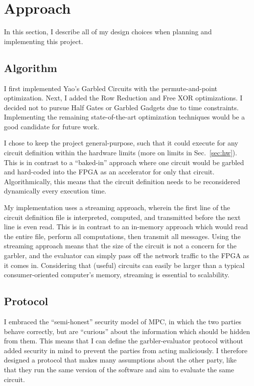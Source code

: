 \section{Approach}
In this section, I describe all of my design choices when planning and implementing this project.

\subsection{Algorithm}
I first implemented Yao's Garbled Circuits with the permute-and-point optimization. Next, I added the Row Reduction and Free XOR optimizations. I decided not to pursue Half Gates or Garbled Gadgets due to time constraints. Implementing the remaining state-of-the-art optimization techniques would be a good candidate for future work.

I chose to keep the project general-purpose, such that it could execute for any circuit definition within the hardware limits (more on limits in Sec.~\ref{sec:hw}). This is in contrast to a ``baked-in'' approach where one circuit would be garbled and hard-coded into the FPGA as an accelerator for only that circuit. Algorithmically, this means that the circuit definition needs to be reconsidered dynamically every execution time.

My implementation uses a streaming approach, wherein the first line of the circuit definition file is interpreted, computed, and transmitted before the next line is even read. This is in contrast to an in-memory approach which would read the entire file, perform all computations, then transmit all messages. Using the streaming approach means that the size of the circuit is not a concern for the garbler, and the evaluator can simply pass off the network traffic to the FPGA as it comes in. Considering that (useful) circuits can easily be larger than a typical consumer-oriented computer's memory, streaming is essential to scalability.

\subsection{Protocol}
I embraced the ``semi-honest'' security model of MPC, in which the two parties behave correctly, but are ``curious'' about the information which should be hidden from them. This means that I can define the garbler-evaluator protocol without added security in mind to prevent the parties from acting maliciously. I therefore designed a protocol that makes many assumptions about the other party, like that they run the same version of the software and aim to evaluate the same circuit.

